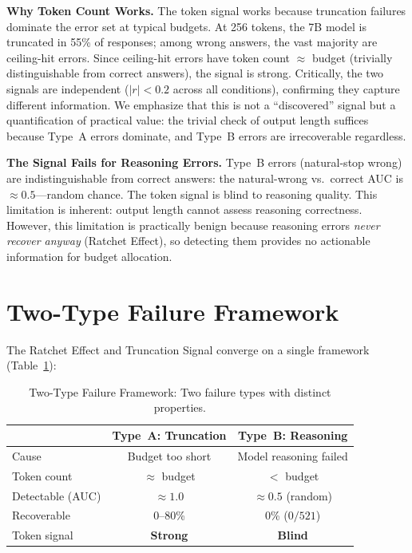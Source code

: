 \documentclass{article}
\begin{document}
\textbf{Why Token Count Works.}
The token signal works because truncation failures dominate the error set at typical budgets. At 256 tokens, the 7B model is truncated in 55\% of responses; among wrong answers, the vast majority are ceiling-hit errors. Since ceiling-hit errors have token count $\approx$ budget (trivially distinguishable from correct answers), the signal is strong. Critically, the two signals are independent ($|r| < 0.2$ across all conditions), confirming they capture different information. We emphasize that this is not a ``discovered'' signal but a quantification of practical value: the trivial check of output length suffices because Type~A errors dominate, and Type~B errors are irrecoverable regardless.

\textbf{The Signal Fails for Reasoning Errors.}
Type~B errors (natural-stop wrong) are indistinguishable from correct answers: the natural-wrong vs.\ correct AUC is $\approx 0.5$---random chance. The token signal is blind to reasoning quality. This limitation is inherent: output length cannot assess reasoning correctness. However, this limitation is practically benign because reasoning errors \emph{never recover anyway} (Ratchet Effect), so detecting them provides no actionable information for budget allocation.

\section{Two-Type Failure Framework}

The Ratchet Effect and Truncation Signal converge on a single framework (Table~\ref{tab:theory}):

\begin{table}[h]
\centering
\caption{Two-Type Failure Framework: Two failure types with distinct properties.}
\label{tab:theory}
\begin{tabular}{lcc}
\toprule
& \textbf{Type~A: Truncation} & \textbf{Type~B: Reasoning} \\
\midrule
Cause & Budget too short & Model reasoning failed \\
Token count & $\approx$ budget & $<$ budget \\
Detectable (AUC) & $\approx 1.0$ & $\approx 0.5$ (random) \\
Recoverable & 0--80\% & 0\% ($0/521$) \\
Token signal & \textbf{Strong} & \textbf{Blind} \\
\bottomrule
\end{tabular}
\end{table}
\end{document}
